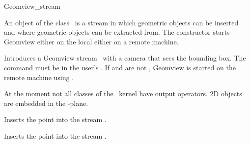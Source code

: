 

\begin{ccRefClass}{Geomview_stream}  %


\ccDefinition
 An object of the class \ccRefName\ is a stream in which geometric
objects can be inserted and where geometric objects can be extracted
from. The constructor starts Geomview either on the local either on
a remote machine. 





\ccCreation
{}  %

{Introduces a Geomview stream \ccVar\ with a camera that sees the
bounding box.  The command  must be in the user's .
If  and  are not ,
Geomview is started on the remote machine using .}

\ccOperations
{}

\def\ccTagRmEigenClassName{\ccFalse}

At the moment not all classes of the \cgal\ kernel have output
operators. 2D objects are embedded in the -plane.

{Inserts the point  into the stream \ccVar.}

\newpage
{}
{Inserts the point  into the stream \ccVar.}



\end{ccRefClass}

